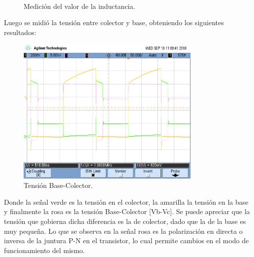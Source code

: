 \begin{figure}[H]
\\
\caption{Medición del valor de la inductancia.}
\label{fig:medL}
\end{figure}
Luego se midió la tensión entre colector y base, obteniendo los siguientes resultados:
\begin{figure}[H]
	\centering
	\includegraphics[width=0.8\textwidth]{Imagenes/vbc_vc_ab.png}
\caption{Tensión Base-Colector.}
	\label{fig:vbc}
\end{figure}
Donde la señal verde es la tensión en el colector, la amarilla la tensión en la base y finalmente la rosa es la tensión Base-Colector [Vb-Vc].
Se puede apreciar que la tensión que gobierna dicha diferencia es la de colector, dado que la de la base es muy pequeña. Lo que se observa en la señal rosa es la polarización en directa o inversa de la juntura P-N  en el transistor, lo cual permite cambios en el modo de funcionamiento del mismo.


